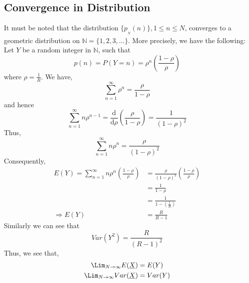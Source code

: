 \begin{multicols}{2}
\section{Convergence in Distribution}\label{section-12}
It must be noted that the distribution  $\{p_{_{\underline{N}}}(n)\}, 1 \leq n \leq N$, converges to a geometric distribution on $\mathbb N = \{1,2,3, \ldots\}$. More precisely, we have the following:\\
Let $Y$ be a random integer in $\mathbb N$, such that
\begin{equation}
p(n) = P(Y=n) = \rho^n \left(\displaystyle{\frac{1-\rho}{\rho}}\right)\label{eq-12.1} 
\end{equation}
where $\rho = \displaystyle{\frac{1}{R}}$.
We have, 
\begin{equation}
\displaystyle{\sum_{n=1}^{\infty}\rho^n} = \displaystyle{\frac{\rho}{1-\rho}}\label{eq-12.2}
\end{equation}
and hence
\begin{equation} \nonumber
\displaystyle{\sum_{n=1}^{\infty}n\rho^{n-1}} = \frac{\mathrm{d}}{\mathrm{d}\rho}\left(\displaystyle{\frac{\rho}{1-\rho}}\right) =  \displaystyle{\frac{1}{(1-\rho)^2}}
\end{equation}
Thus,
\begin{equation}\nonumber
\displaystyle{\sum_{n=1}^{\infty}n\rho^{n}} = \displaystyle{\frac{\rho}{(1-\rho)^2}}
\end{equation}
Consequently,
\begin{align}
E(Y) = \displaystyle{\sum_{n=1}^{\infty}n\rho^{n}}\left(\displaystyle{\frac{1-\rho}{\rho}}\right) &= \displaystyle{\frac{\rho}{(1-\rho)^2}}\left(\displaystyle{\frac{1-\rho}{\rho}}\right)\nonumber\\
 &= \displaystyle{\frac{1}{1-\rho}}\nonumber\\
 &= \displaystyle{\frac{1}{1-\displaystyle{\left(\frac{1}{R}\right)}}}\nonumber\\
\Rightarrow E(Y) &= \displaystyle{\frac{R}{R-1}}\label{eq-12.3}
\end{align}
Similarly we can see that 
\begin{equation}
Var(Y^2) = \displaystyle{\frac{R}{(R-1)^2}}\label{eq-12.4}
\end{equation}
Thus, we see that,
\begin{align}
\displaystyle{\Lim_{N \rightarrow \infty}}E(\underline{X}) &= E(Y)\nonumber\\
\displaystyle{\Lim_{N \rightarrow \infty}}Var(\underline{X}) &= Var(Y)\nonumber
\end{align}

\end{multicols}
